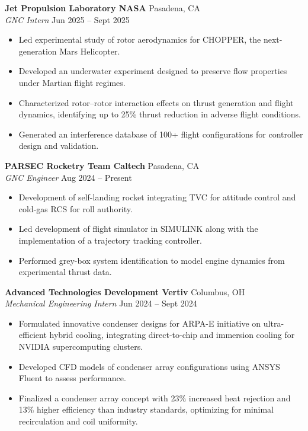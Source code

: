 \documentclass[11pt,a4paper]{article}
\begin{document}
\noindent\textbf{Jet Propulsion Laboratory \textbar{} NASA} \hfill Pasadena, CA\\
\textit{GNC Intern} \hfill Jun 2025 -- Sept 2025
\begin{itemize}[leftmargin=1.2em, itemsep=0.2pt, topsep=0.4pt, after=\vspace{4pt}]
    \item Led experimental study of rotor aerodynamics for CHOPPER, the next-generation Mars Helicopter.
    \item Developed an underwater experiment designed to preserve flow properties under Martian flight regimes.
    \item Characterized rotor–rotor interaction effects on thrust generation and flight dynamics, identifying up to 25\% thrust reduction in adverse flight conditions.
    \item Generated an interference database of 100+ flight configurations for controller design and validation.
\end{itemize}

\noindent\textbf{PARSEC Rocketry Team \textbar{} Caltech} \hfill Pasadena, CA\\
\textit{GNC Engineer} \hfill Aug 2024 -- Present
\begin{itemize}[leftmargin=1.2em, itemsep=0.2pt, topsep=0.4pt, after=\vspace{4pt}]
    \item Development of self-landing rocket integrating TVC for attitude control and cold-gas RCS for roll authority.
    \item Led development of flight simulator in SIMULINK along with the implementation of a trajectory tracking controller.
    \item Performed grey-box system identification to model engine dynamics from experimental thrust data.
\end{itemize}

\noindent\textbf{Advanced Technologies Development \textbar{} Vertiv} \hfill Columbus, OH\\
\textit{Mechanical Engineering Intern} \hfill Jun 2024 -- Sept 2024
\begin{itemize}[leftmargin=1.2em, itemsep=0.2pt, topsep=0.4pt, after=\vspace{4pt}]
    \item Formulated innovative condenser designs for ARPA-E initiative on ultra-efficient hybrid cooling, integrating direct-to-chip and immersion cooling for NVIDIA supercomputing clusters.
    \item Developed CFD models of condenser array configurations using ANSYS Fluent to assess performance.
    \item Finalized a condenser array concept with 23\% increased heat rejection and 13\% higher efficiency than industry standards, optimizing for minimal recirculation and coil uniformity.
\end{itemize}
\end{document}
